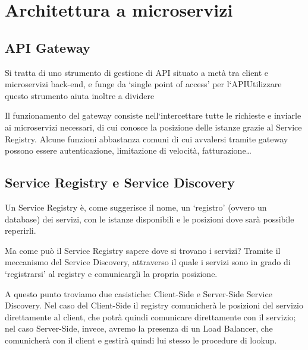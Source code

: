 \chapter{Architettura a microservizi}
\section{API Gateway}
Si tratta di uno strumento di gestione di API situato a metà tra client e microservizi back-end, e funge da `single point of access' per l`API\@ Utilizzare questo strumento aiuta inoltre a dividere 

Il funzionamento del gateway consiste nell`intercettare tutte le richieste e inviarle ai microservizi necessari, di cui conosce la posizione delle istanze grazie al Service Registry. Alcune funzioni abbastanza comuni di cui avvalersi tramite gateway possono essere autenticazione, limitazione di velocità, fatturazione\dots

\section{Service Registry e Service Discovery}
Un Service Registry è, come suggerisce il nome, un `registro' (ovvero un database) dei servizi, con le istanze disponibili e le posizioni dove sarà possibile reperirli.

Ma come può il Service Registry sapere dove si trovano i servizi? Tramite il meccanismo del Service Discovery, attraverso il quale i servizi sono in grado di `registrarsi' al registry e comunicargli la propria posizione.

A questo punto troviamo due casistiche: Client-Side e Server-Side Service Discovery. Nel caso del Client-Side il registry comunicherà le posizioni del servizio direttamente al client, che potrà quindi comunicare direttamente con il servizio; nel caso Server-Side, invece, avremo la presenza di un Load Balancer, che comunicherà con il client e gestirà quindi lui stesso le procedure di lookup.

